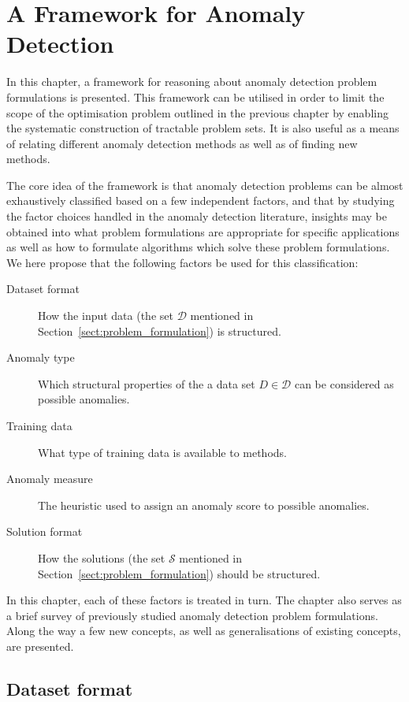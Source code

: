 \chapter{A Framework for Anomaly Detection}
\label{ch:framework}

In this chapter, a framework for reasoning about anomaly detection problem formulations is presented. This framework can be utilised in order to limit the scope of the optimisation problem outlined in the previous chapter by enabling the systematic construction of tractable problem sets. It is also useful as a means of relating different anomaly detection methods as well as of finding new methods.

The core idea of the framework is that anomaly detection problems can be almost exhaustively classified based on a few independent factors, and that by studying the factor choices handled in the anomaly detection literature, insights may be obtained into what problem formulations are appropriate for specific applications as well as how to formulate algorithms which solve these problem formulations. We here propose that the following factors be used for this classification:
\begin{description}
  \item[Dataset format] How the input data (the set $\mathcal{D}$ mentioned in Section~\ref{sect:problem_formulation}) is structured.
  \item[Anomaly type] Which structural properties of the a data set $D \in \mathcal{D}$ can be considered as possible anomalies.
  \item[Training data] What type of training data is available to methods.
  \item[Anomaly measure] The heuristic used to assign an anomaly score to possible anomalies.
  \item[Solution format] How the solutions (the set $\mathcal{S}$ mentioned in Section~\ref{sect:problem_formulation}) should be structured.
\end{description}
In this chapter, each of these factors is treated in turn. The chapter also serves as a brief survey of previously studied anomaly detection problem formulations. Along the way a few new concepts, as well as generalisations of existing concepts, are presented.

\section{Dataset format}
\label{sect:data_format}


